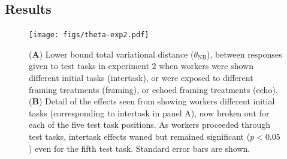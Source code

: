 \documentclass{sigchi}
\begin{document}
\subsection{Results}

\begin{figure}[t]
    \centering
	\texttt{[image: figs/theta-exp2.pdf]}
	\caption{
	    (\textbf{A}) Lower bound total variational distance 
		($\theta_\mathrm{NB}$), between 
		responses given to test tasks in experiment 2 
		when workers were shown different initial tasks (intertask), 
		or were exposed to different framing treatments (framing), or 
		echoed framing treatments (echo).
		(\textbf{B}) Detail of the effects seen from showing
		workers different initial tasks (corresponding to intertask in 
		panel A), now broken out for each of the five test task positions.
		As workers proceeded through test tasks, intertask effects waned
		but remained significant ($p<0.05$) even for the fifth test task.
		Standard error bars are shown.
	}
	\label{fig:theta}
\end{figure}
\end{document}
